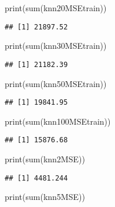 \documentclass[
]{article}
\newenvironment{Shaded}{\begin{snugshade}}{\end{snugshade}}
\newcommand{\FunctionTok}[1]{\textcolor[rgb]{0.00,0.00,0.00}{#1}}
\newcommand{\NormalTok}[1]{#1}
\begin{document}
\begin{Shaded}
\begin{Highlighting}[]
\FunctionTok{print}\NormalTok{(}\FunctionTok{sum}\NormalTok{(knn20MSEtrain))}
\end{Highlighting}
\end{Shaded}

\begin{verbatim}
## [1] 21897.52
\end{verbatim}

\begin{Shaded}
\begin{Highlighting}[]
\FunctionTok{print}\NormalTok{(}\FunctionTok{sum}\NormalTok{(knn30MSEtrain))}
\end{Highlighting}
\end{Shaded}

\begin{verbatim}
## [1] 21182.39
\end{verbatim}

\begin{Shaded}
\begin{Highlighting}[]
\FunctionTok{print}\NormalTok{(}\FunctionTok{sum}\NormalTok{(knn50MSEtrain))}
\end{Highlighting}
\end{Shaded}

\begin{verbatim}
## [1] 19841.95
\end{verbatim}

\begin{Shaded}
\begin{Highlighting}[]
\FunctionTok{print}\NormalTok{(}\FunctionTok{sum}\NormalTok{(knn100MSEtrain))}
\end{Highlighting}
\end{Shaded}

\begin{verbatim}
## [1] 15876.68
\end{verbatim}

\begin{Shaded}
\begin{Highlighting}[]
\FunctionTok{print}\NormalTok{(}\FunctionTok{sum}\NormalTok{(knn2MSE))}
\end{Highlighting}
\end{Shaded}

\begin{verbatim}
## [1] 4481.244
\end{verbatim}

\begin{Shaded}
\begin{Highlighting}[]
\FunctionTok{print}\NormalTok{(}\FunctionTok{sum}\NormalTok{(knn5MSE))}
\end{Highlighting}
\end{Shaded}
\end{document}
